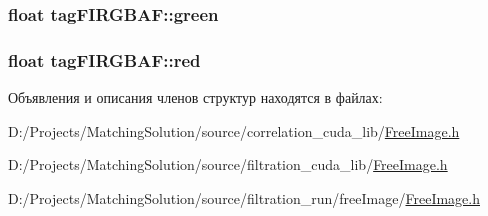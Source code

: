 \hypertarget{structtag_f_i_r_g_b_a_f_c4e284e0711fdba31b624cee92d85e2b}{
\subsubsection[{green}]{\setlength{\rightskip}{0pt plus 5cm}float {\bf tagFIRGBAF::green}}}
\label{structtag_f_i_r_g_b_a_f_c4e284e0711fdba31b624cee92d85e2b}


\hypertarget{structtag_f_i_r_g_b_a_f_59e5260e2f6e013661bc5d4775b18d9e}{
\subsubsection[{red}]{\setlength{\rightskip}{0pt plus 5cm}float {\bf tagFIRGBAF::red}}}
\label{structtag_f_i_r_g_b_a_f_59e5260e2f6e013661bc5d4775b18d9e}




Объявления и описания членов структур находятся в файлах:\begin{CompactItemize}
\item 
D:/Projects/MatchingSolution/source/correlation\_\-cuda\_\-lib/\hyperlink{correlation__cuda__lib_2_free_image_8h}{FreeImage.h}\item 
D:/Projects/MatchingSolution/source/filtration\_\-cuda\_\-lib/\hyperlink{filtration__cuda__lib_2_free_image_8h}{FreeImage.h}\item 
D:/Projects/MatchingSolution/source/filtration\_\-run/freeImage/\hyperlink{filtration__run_2free_image_2_free_image_8h}{FreeImage.h}\end{CompactItemize}
